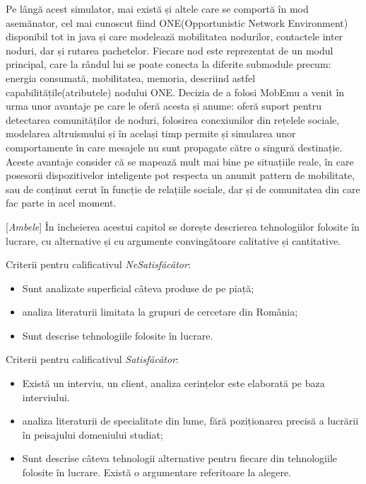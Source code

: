 \documentclass[12pt,a4paper]{report}
\newcommand{\worktype}[1]{[\textit{#1}] }
\newcommand{\dezvoltare}{\worktype{Dezvoltare de produs}}
\newcommand{\cercetare}{\worktype{Cercetare}}
\newcommand{\ambele}{\worktype{Ambele}}
\begin{document}
Pe lângă acest simulator, mai există și altele care se comportă în mod asemănator, cel mai cunoscut fiind ONE(Opportunistic Network Environment)~\cite{OneArticle} disponibil tot in java și care modelează mobilitatea nodurilor, contactele inter noduri, dar și rutarea pachetelor. Fiecare nod este reprezentat de un modul principal, care la rândul lui se poate conecta la diferite submodule precum: energia consumată, mobilitatea, memoria, descriind astfel capabilitățile(atributele) nodului ONE. Decizia de a folosi MobEmu a venit în urma unor avantaje pe care le oferă acesta și anume: oferă suport pentru detectarea comunităților de noduri, folosirea conexiunilor din rețelele sociale, modelarea altruismului și în același timp permite și simularea unor comportamente în care mesajele nu sunt propagate către o singură destinație. Aceste avantaje consider că se mapează mult mai bine pe situațiile reale, în care posesorii dispozitivelor inteligente pot respecta un anumit pattern de mobilitate, sau de conținut cerut în funcție de relațiile sociale, dar și de comunitatea din care fac parte in acel moment.  


\ambele În încheierea acestui capitol se dorește descrierea tehnologiilor folosite în lucrare, cu alternative și cu argumente convingătoare calitative și cantitative.  

Criterii pentru calificativul \textit{Ne\textit{Satisfăcător}}: 
\begin{itemize}
	\item \dezvoltare Sunt analizate superficial câteva produse de pe piață; 
	\item \cercetare analiza literaturii limitata la grupuri de cercetare din România;
	\item \ambele Sunt descrise tehnologiile folosite în lucrare. 
\end{itemize}

Criterii pentru calificativul \textit{Satisfăcător}:
\begin{itemize}
	\item \dezvoltare Există un interviu, un client, analiza cerințelor este elaborată pe baza interviului.
	\item \cercetare analiza literaturii de specialitate din lume, fără poziționarea precisă a lucrării în peisajului domeniului studiat;
	\item \ambele Sunt descrise câteva tehnologii alternative pentru fiecare din tehnologiile folosite în lucrare. Există o argumentare referitoare la alegere.
\end{itemize}
\end{document}
